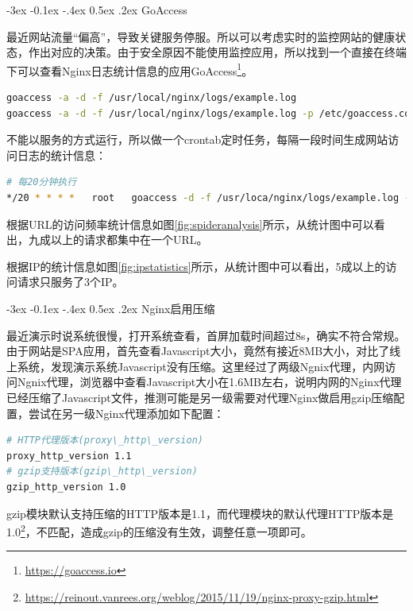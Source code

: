 \documentclass[8pt]{book}
\makeatletter
\numberwithin{dummy}{section}
\theoremstyle{ocrenumbox}
\theoremstyle{blacknumex}
\theoremstyle{blacknumbox}
\theoremstyle{ocrenum}
\renewcommand{\subsection}{\@startsection {subsection}{2}{\z@}
	{-3ex \@plus -0.1ex \@minus -.4ex}
	{0.5ex \@plus.2ex }
	{\normalfont\sffamily\bfseries}}
\makeatother
\begin{document}
\subsection{GoAccess}

最近网站流量“偏高”，导致关键服务停服。所以可以考虑实时的监控网站的健康状态，作出对应的决策。由于安全原因不能使用监控应用，所以找到一个直接在终端下可以查看Nginx日志统计信息的应用GoAccess\footnote{\url{https://goaccess.io}}。

\begin{lstlisting}[language=Bash]
goaccess -a -d -f /usr/local/nginx/logs/example.log
goaccess -a -d -f /usr/local/nginx/logs/example.log -p /etc/goaccess.conf -o /data/html/hexo/public/go-access.html
\end{lstlisting}

不能以服务的方式运行，所以做一个crontab定时任务，每隔一段时间生成网站访问日志的统计信息：

\begin{lstlisting}[language=Bash]
# 每20分钟执行
*/20 * * * *   root   goaccess -d -f /usr/loca/nginx/logs/example.log -p /usr/local/etc/goaccess.conf
\end{lstlisting}

根据URL的访问频率统计信息如图\ref{fig:spideranalysis}所示，从统计图中可以看出，九成以上的请求都集中在一个URL。



根据IP的统计信息如图\ref{fig:ipstatistics}所示，从统计图中可以看出，5成以上的访问请求只服务了3个IP。



\subsection{Nginx启用压缩}

最近演示时说系统很慢，打开系统查看，首屏加载时间超过8s，确实不符合常规。由于网站是SPA应用，首先查看Javascript大小，竟然有接近8MB大小，对比了线上系统，发现演示系统Javascript没有压缩。这里经过了两级Ngnix代理，内网访问Ngnix代理，浏览器中查看Javascript大小在1.6MB左右，说明内网的Nginx代理已经压缩了Javascript文件，推测可能是另一级需要对代理Nginx做启用gzip压缩配置，尝试在另一级Nginx代理添加如下配置：

\begin{lstlisting}[language=Bash]
# HTTP代理版本(proxy\_http\_version)
proxy_http_version 1.1
# gzip支持版本(gzip\_http\_version)
gzip_http_version 1.0
\end{lstlisting}

gzip模块默认支持压缩的HTTP版本是1.1，而代理模块的默认代理HTTP版本是1.0\footnote{\url{https://reinout.vanrees.org/weblog/2015/11/19/nginx-proxy-gzip.html}}，不匹配，造成gzip的压缩没有生效，调整任意一项即可。
\end{document}
